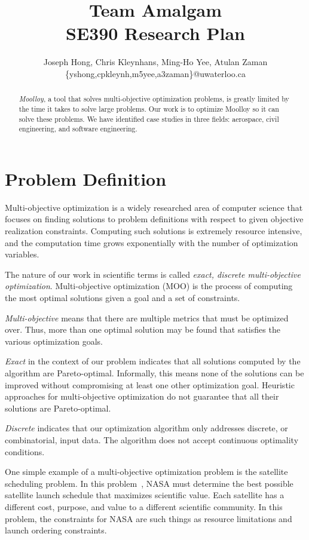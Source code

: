 \documentclass[11pt]{article}
\title{{\Large Team Amalgam} \\ SE390 Research Plan}
\author{Joseph Hong, Chris Kleynhans, Ming-Ho Yee, Atulan Zaman \\
        \{yshong,cpkleynh,m5yee,a3zaman\}@uwaterloo.ca}
\begin{document}
\maketitle

\begin{abstract}
\textit{Moolloy}, a tool that solves multi-objective optimization
problems, is greatly limited by the time it takes to solve large
problems. Our work is to optimize Moolloy so it can solve these
problems. We have identified case studies in three fields: aerospace,
civil engineering, and software engineering.
\end{abstract}

\tableofcontents
\newpage

\section{Problem Definition}\label{sec:problem_def}
Multi-objective optimization is a widely researched area of computer
science that focuses on finding solutions to problem definitions with
respect to given objective realization constraints. Computing such
solutions is extremely resource intensive, and the computation time
grows exponentially with the number of optimization variables.

The nature of our work in scientific terms is called \textit{exact,
discrete multi-objective optimization}. Multi-objective optimization
(MOO) is the process of computing the most optimal solutions given a
goal and a set of constraints.

\textit{Multi-objective} means that there are multiple metrics that
must be optimized over. Thus, more than one optimal solution may be
found that satisfies the various optimization goals.

\textit{Exact} in the context of our problem indicates that all
solutions computed by the algorithm are Pareto-optimal. Informally,
this means none of the solutions can be improved without compromising
at least one other optimization goal. Heuristic approaches for
multi-objective optimization do not guarantee that all their solutions
are Pareto-optimal.

\textit{Discrete} indicates that our optimization algorithm only
addresses discrete, or combinatorial, input data. The algorithm does
not accept continuous optimality conditions.

One simple example of a multi-objective optimization problem is the
satellite scheduling problem. In this problem~\cite{ref:nasa11}, NASA
must determine the best possible satellite launch schedule that
maximizes scientific value. Each satellite has a different cost,
purpose, and value to a different scientific community. In this
problem, the constraints for NASA are such things as resource
limitations and launch ordering constraints.
\end{document}
